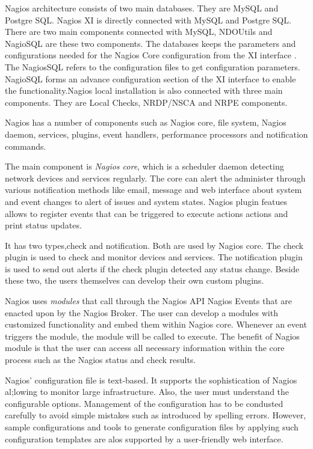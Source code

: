 \documentclass[9pt,twocolumn,twoside]{styles/osajnl}
\begin{document}
Nagios architecture consists of two main databases. They are MySQL and
Postgre SQL.  Nagios XI is directly connected with MySQL and Postgre
SQL. There are two main components connected with MySQL, NDOUtils and
NagioSQL are these two components. The databases keeps the parameters
and configurations needed for the Nagios Core configuration from the
XI interface \cite{archi-nagios}. The NagiosSQL refers to the
configuration files to get configuration parameters. NagioSQL forms an
advance configuration section of the XI interface to enable the
functionality.Nagios local installation is also connected with three
main components. They are Local Checks, NRDP/NSCA and NRPE components.

Nagios has a number of components such as Nagios core, file system,
Nagios daemon, services, plugins, event handlers, performance processors
and notification commands.

The main component is {\em Nagios core}, which is a scheduler daemon
detecting network devices and services regularly. The core can alert
the administer through various notification methods like email,
message and web interface about system and event changes to alert of
issues and system states. Nagios plugin featues allows to register
events that can be triggered to execute actions actions and print
status updates.

It has two types,check and notification. Both are used by Nagios
core. The check plugin is used to check and monitor devices and
services. The notification plugin is used to send out alerts if the
check plugin detected any status change. Beside these two, the users
themselves can develop their own custom plugins.

Nagios uses {\em modules} that call through the Nagios API Nagios
Events that are enacted upon by the Nagios Broker. The user can
develop a modules with customized functionality and embed them within
Nagios core. Whenever an event triggers the module, the module
will be called to execute. The benefit of Nagios module is that the
user can access all necessary information within the core process such
as the Nagios status and check results.

Nagios' configuration file is text-based. It supports the
sophistication of Nagios al;lowing to monitor large
infrastructure. Also, the user must understand the configurable
options. Management of the configuration has to be condusted carefully
to avoid simple mistakes such as introduced by spelling
errors. However, sample configurations and tools to generate
configuration files by applying such configuration templates are alos
supported by a user-friendly web interface.
\end{document}
